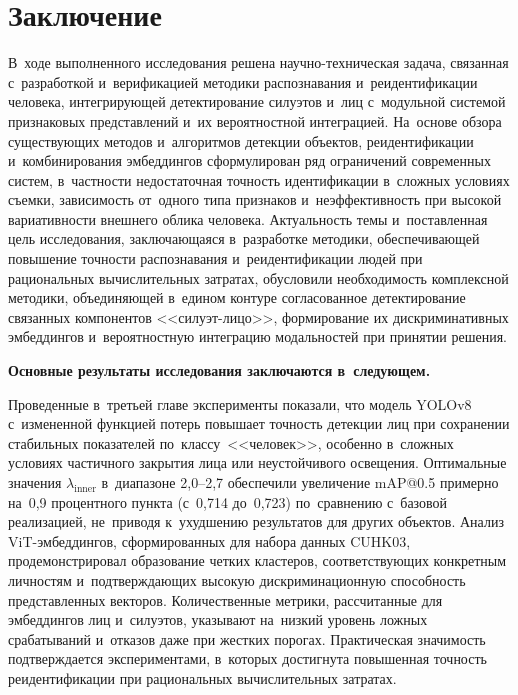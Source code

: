 \chapter*{Заключение}                       %

В~ходе выполненного исследования решена научно-техническая задача,
связанная с~разработкой и~верификацией методики распознавания
и~реидентификации человека, интегрирующей детектирование силуэтов
и~лиц с~модульной системой признаковых представлений и~их вероятностной
интеграцией. На~основе обзора существующих методов и~алгоритмов
детекции объектов, реидентификации и~комбинирования эмбеддингов
сформулирован ряд ограничений современных систем, в~частности
недостаточная точность идентификации в~сложных условиях съемки,
зависимость от~одного типа признаков и~неэффективность при высокой
вариативности внешнего облика человека. Актуальность темы
и~поставленная цель исследования, заключающаяся в~разработке методики,
обеспечивающей повышение точности распознавания и~реидентификации
людей при рациональных вычислительных затратах, обусловили
необходимость комплексной методики, объединяющей в~едином контуре
согласованное детектирование связанных компонентов <<силуэт-лицо>>,
формирование их дискриминативных эмбеддингов и~вероятностную интеграцию
модальностей при принятии решения.

\textbf{Основные результаты исследования заключаются в~следующем.}


Проведенные в~третьей главе эксперименты показали, что модель YOLOv8
с~измененной функцией потерь повышает точность детекции
лиц при сохранении стабильных показателей по~классу~<<человек>>,
особенно в~сложных условиях частичного закрытия лица или неустойчивого
освещения. Оптимальные значения $\lambda_{\text{inner}}$ в~диапазоне
2,0--2,7 обеспечили увеличение mAP@0.5 примерно на~0,9 процентного
пункта (с~0,714 до~0,723) по~сравнению с~базовой реализацией, не~приводя к~ухудшению результатов
для других объектов. Анализ ViT-эмбеддингов, сформированных для
набора данных CUHK03, продемонстрировал образование четких кластеров,
соответствующих конкретным личностям и~подтверждающих
высокую дискриминационную способность представленных векторов.
Количественные метрики, рассчитанные для эмбеддингов лиц и~силуэтов,
указывают на~низкий уровень ложных срабатываний и~отказов даже при
жестких порогах. Практическая значимость подтверждается
экспериментами, в~которых достигнута повышенная точность реидентификации
при рациональных вычислительных затратах.

